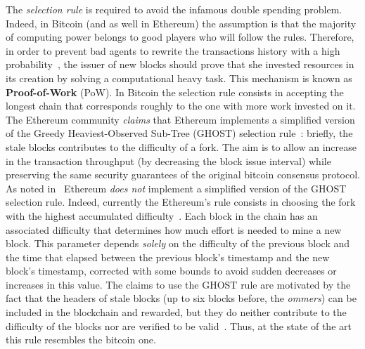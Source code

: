 The \emph{selection rule} is required to avoid the infamous double spending
problem. Indeed, in Bitcoin (and as well in Ethereum) the assumption is that the
majority of computing power belongs to good players who will follow the rules.
Therefore, in order to prevent bad agents to rewrite the transactions history
with a high probability~\cite{bib:bitcoin}, the issuer of new blocks should
prove that she invested resources in its creation by solving a computational
heavy task. This mechanism is known as \textbf{Proof-of-Work} (PoW). In Bitcoin
the selection rule consists in accepting the longest chain that corresponds
roughly to the one with more work invested on it. 
The Ethereum
community \emph{claims} that Ethereum implements a simplified version of the 
Greedy Heaviest-Observed Sub-Tree (GHOST) selection 
rule~\cite{wood2018ethereum}:
briefly, the stale blocks contributes to the difficulty of a fork.
The aim is to allow an increase in the transaction throughput (by decreasing 
the block issue interval) while preserving the same security guarantees of the
original bitcoin consensus protocol.
As noted in~\cite{bib:securityAndScalabilityPoW} Ethereum \emph{does not}
implement a simplified version of the GHOST selection rule.
Indeed,
currently the Ethereum's rule consists in choosing the fork with the
highest accumulated difficulty~\cite{wood2018ethereum}. 
Each block in the chain has an
associated difficulty that determines how much effort is needed to mine a new
block. This parameter depends \emph{solely} on the difficulty of the previous
block and the time that elapsed between the previous block's timestamp and the
new block's timestamp, corrected with some bounds to avoid sudden decreases or
increases in this value. The claims to use the GHOST rule are motivated by the
fact that the headers of stale blocks (up to six blocks before, the
\emph{ommers}) can be included in the blockchain and rewarded, but they do
neither contribute to the difficulty of the blocks nor are verified to be
valid~\cite{bib:securityAndScalabilityPoW}. Thus, at the state of the art
this rule resembles the bitcoin one.





